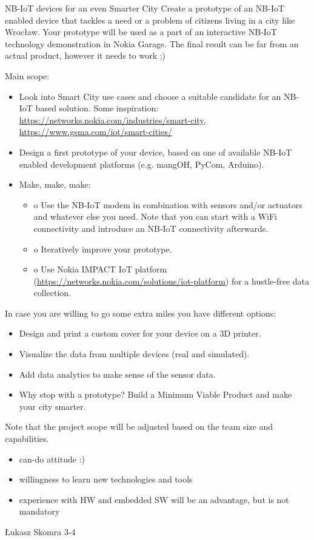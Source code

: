 \begin{project}
{NB-IoT devices for an even Smarter City}
{Create a prototype of an NB-IoT enabled device that tackles a need or a problem of citizens living in a city like Wrocław.
Your prototype will be used as a part of an interactive NB-IoT technology demonstration in Nokia Garage.
The final result can be far from an actual product, however it needs to work ;)
} 
{
Main scope:
\begin{itemize}
	\item Look into Smart City use cases and choose a suitable candidate for an NB-IoT based solution. Some inspiration: \url{https://networks.nokia.com/industries/smart-city}, \url{https://www.gsma.com/iot/smart-cities/}
	\item Design a first prototype of your device, based on one of available NB-IoT enabled development platforms (e.g. mangOH, PyCom, Arduino).
	\item Make, make, make:
		\begin{itemize}
			\item o	Use the NB-IoT modem in combination with sensors and/or actuators and whatever else you need. Note that you can start with a WiFi connectivity and introduce an NB-IoT connectivity afterwards.
			\item o	Iteratively improve your prototype.
			\item o	Use Nokia IMPACT IoT platform (\url{https://networks.nokia.com/solutions/iot-platform}) for a hustle-free data collection.
		\end{itemize}
\end{itemize}

In case you are willing to go some extra miles you have different options: 
\begin{itemize}
	\item Design and print a custom cover for your device on a 3D printer.
	\item Visualize the data from multiple devices (real and simulated).
	\item Add data analytics to make sense of the sensor data.
	\item Why stop with a prototype? Build a Minimum Viable Product and make your city smarter.
\end{itemize}
Note that the project scope will be adjusted based on the team size and capabilities.
}
{
\begin{itemize}
	\item can-do attitude :)
	\item willingness to learn new technologies and tools
	\item experience with HW and embedded SW will be an advantage, but is not mandatory
\end{itemize}
}
{Łukasz Skomra}
{3-4}
\end{project}
